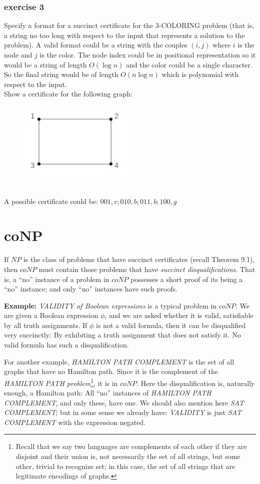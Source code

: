 \documentclass[12pt]{article}
\begin{document}
\subsubsection{exercise 3}
Specify a format for a succinct certificate for the \textsc{3-COLORING} problem (that is, a string no too long with respect to the input that represents a solution to the problem). A valid format could be a string with the couples $(i,j)$ where $i$ is the node and $j$ is the color. The node index could be in positional representation so it would be a string of length $O(\log n)$ and the color could be a single character. So the final string would be of length $O(n \log n)$ which is polynomial with respect to the input.\\
Show a certificate for the following graph:
\begin{figure}[ht]
  \centering
  \includegraphics[width=0.5\textwidth]{img/es3.png}
\end{figure}
\\
A possible certificate could be:
$001,r;010,b;011,b;100,g$

\newpage
\section{coNP}
If $NP$ is the class of problems that have succinct certificates (recall Theorem 9.1), then $coNP$ must contain those problems that have \textit{succinct disqualifications}. That is, a ``no'' instance of a problem in $coNP$ possesses a short proof of its being a ``no'' instance; and only ``no'' instances have such proofs.

\textbf{Example:} \textit{VALIDITY of Boolean expressions} is a typical problem in $coNP$. We are given a Boolean expression $\phi$, and we are asked whether it is valid, satisfiable by all truth assignments. If $\phi$ is not a valid formula, then it can be disqualified very succinctly: By exhibiting a truth assignment that does not satisfy it. No valid formula has such a disqualification.

For another example, \textit{HAMILTON PATH COMPLEMENT} is the set of all graphs that have no Hamilton path. Since it is the complement of the \textit{HAMILTON PATH problem}\footnote{Recall that we say two languages are complements of each other if they are disjoint and their union is, not necessarily the set of all strings, but some other, trivial to recognize set; in this case, the set of all strings that are legitimate encodings of graphs.}, it is in $coNP$. Here the disqualification is, naturally enough, a Hamilton path: All ``no'' instances of \textit{HAMILTON PATH COMPLEMENT}, and only these, have one. We should also mention here \textit{SAT COMPLEMENT}; but in some sense we already have: \textit{VALIDITY} is just \textit{SAT COMPLEMENT} with the expression negated.
\end{document}

